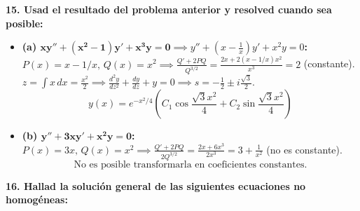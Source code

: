 \documentclass[11pt, a4paper]{article}
\begin{document}
\noindent\textbf{15. Usad el resultado del problema anterior y resolved cuando sea posible:}

\begin{itemize}
\item \textbf{(a) $\bm{xy''+(x^2-1)y'+x^3y=0} \implies y'' + \left(x - \frac{1}{x}\right)y' + x^2 y = 0$:} \\
$P(x) = x - 1/x, \, Q(x) = x^2 \implies \frac{Q'+2PQ}{Q^{3/2}} = \frac{2x + 2(x-1/x)x^2}{x^3} = 2$ (constante). \\
$z = \int x \, dx = \frac{x^2}{2} \implies \frac{d^2y}{dz^2} + \frac{dy}{dz} + y = 0 \implies s = -\frac{1}{2} \pm i\frac{\sqrt{3}}{2}$.
\[
\boxed{y(x) = e^{-x^2/4}\left(C_1 \cos\frac{\sqrt{3}x^2}{4} + C_2 \sin\frac{\sqrt{3}x^2}{4}\right)}
\]

\item \textbf{(b) $\bm{y''+3xy'+x^2y=0}$:} \\
$P(x) = 3x, \, Q(x) = x^2 \implies \frac{Q'+2PQ}{2Q^{3/2}} = \frac{2x + 6x^3}{2x^3} = 3 + \frac{1}{x^2}$ (no es constante).
\[
\boxed{\text{No es posible transformarla en coeficientes constantes.}}
\]
\end{itemize}


\noindent\textbf{16. Hallad la solución general de las siguientes ecuaciones no homogéneas:}
\end{document}
